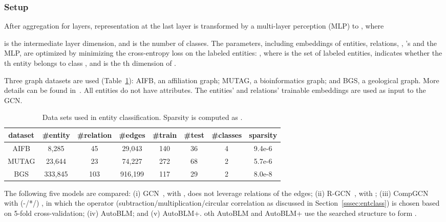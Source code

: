 \documentclass[10pt,journal,compsoc]{IEEEtran}
\begin{document}
\subsubsection{Setup}

After aggregation for  layers,
representation 
at the last layer 
is transformed by a multi-layer perception (MLP) to
,
where
 
is 
the intermediate layer dimension,
and 
is the number of classes.
The parameters,
including embeddings of entities, relations,
, 's and the MLP,
are optimized by minimizing the cross-entropy loss 
on the labeled entities:
,
where  is the set of labeled entities,
 indicates whether the th entity belongs to class ,
and  is the th dimension of .

Three graph datasets 
are used 
(Table~\ref{tab:stat:entclass}):
AIFB, an affiliation graph;
MUTAG, 
a bioinformatics graph;
and BGS, 
a geological graph.
More details can be found in~\cite{ristoski2016rdf2vec}.
All entities do not have attributes.
The entities' and relations'
trainable embeddings
are used 
as input to the GCN.

\begin{table}[ht]
	\centering
	\vspace{-5px}
	\caption{Data sets used in entity classification.
	Sparsity is computed as .}
	\label{tab:stat:entclass}
	\vspace{-10px}
	\setlength\tabcolsep{2.5pt}
	\begin{tabular}{c|ccccccc}
		\toprule
		dataset & \#entity     & \#relation & \#edges   & \#train & \#test & \#classes & sparsity \\ \midrule
		AIFB    & 8,285   & 45  & 29,043  &  140     & 36     & 4     &  9.4e-6\\
		MUTAG   & 23,644  & 23  & 74,227  &  272     &   68   & 2   &  5.7e-6  \\
		BGS     & 333,845 & 103 & 916,199 &   117    &  29    & 2     & 8.0e-8 \\ \bottomrule
	\end{tabular}
\vspace{-5px}
\end{table}

The following five models
are compared:
(i) GCN~\cite{kipf2016semi},
with ,
does not leverage relations of the edges;
(ii) 
R-GCN~\cite{schlichtkrull2018modeling}, with 
;
(iii) CompGCN~\cite{vashishth2019composition} with 
 (-/*/) ,
in which the operator (subtraction/multiplication/circular correlation as
discussed in Section~\ref{sssec:entclass})
is chosen based on 
5-fold cross-validation;
(iv) AutoBLM; and (v) AutoBLM+.
oth 
AutoBLM and AutoBLM+
use the searched structure  to form 
.
\end{document}
